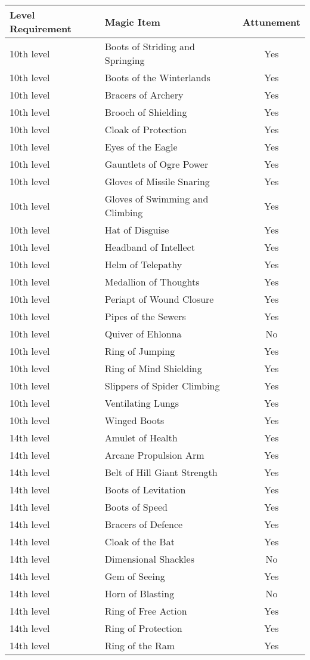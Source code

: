 \documentclass[11pt, A4paper, english]{article}
\begin{document}
			\begin{tabularx}{122.7mm}{|l|l|c|}
\hline
Level Requirement	& Magic Item						& Attunement	\\
\hline
10th level			& Boots of Striding and Springing	& Yes			\\
10th level			& Boots of the Winterlands			& Yes			\\
10th level			& Bracers of Archery				& Yes			\\
10th level			& Brooch of Shielding				& Yes			\\
10th level			& Cloak of Protection				& Yes			\\
10th level			& Eyes of the Eagle					& Yes			\\
10th level			& Gauntlets of Ogre Power			& Yes			\\
10th level			& Gloves of Missile Snaring			& Yes			\\
10th level			& Gloves of Swimming and Climbing	& Yes			\\
10th level			& Hat of Disguise					& Yes 			\\
10th level			& Headband of Intellect				& Yes			\\
10th level			& Helm of Telepathy					& Yes			\\
10th level			& Medallion of Thoughts				& Yes			\\
10th level			& Periapt of Wound Closure			& Yes			\\
10th level			& Pipes of the Sewers				& Yes			\\
10th level			& Quiver of Ehlonna					& No			\\
10th level			& Ring of Jumping					& Yes			\\
10th level			& Ring of Mind Shielding			& Yes			\\
10th level			& Slippers of Spider Climbing		& Yes			\\
10th level			& Ventilating Lungs					& Yes			\\
10th level			& Winged Boots						& Yes			\\
\hline
14th level			& Amulet of Health					& Yes			\\
14th level			& Arcane Propulsion Arm				& Yes			\\
14th level			& Belt of Hill Giant Strength		& Yes			\\
14th level			& Boots of Levitation				& Yes			\\
14th level			& Boots of Speed					& Yes			\\
14th level			& Bracers of Defence				& Yes			\\
14th level			& Cloak of the Bat					& Yes			\\
14th level			& Dimensional Shackles				& No			\\
14th level			& Gem of Seeing						& Yes			\\
14th level			& Horn of Blasting					& No			\\
14th level			& Ring of Free Action				& Yes			\\
14th level			& Ring of Protection				& Yes			\\
14th level			& Ring of the Ram					& Yes			\\
\hline
			\end{tabularx}
\end{document}
